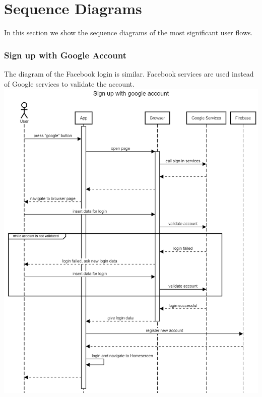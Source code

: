 \documentclass[10pt]{article}
\begin{document}
    \newpage
	\section{Sequence Diagrams}
	In this section we show the sequence diagrams of the most significant user flows.
	\subsubsection{Sign up with Google Account}
	The diagram of the Facebook login is similar. Facebook services are used instead of Google services to validate the account.
	\newline
	\newline
	\newline
	\includegraphics[scale=0.30]{resources/SignUpGoogle.png}
	\newpage
\end{document}
